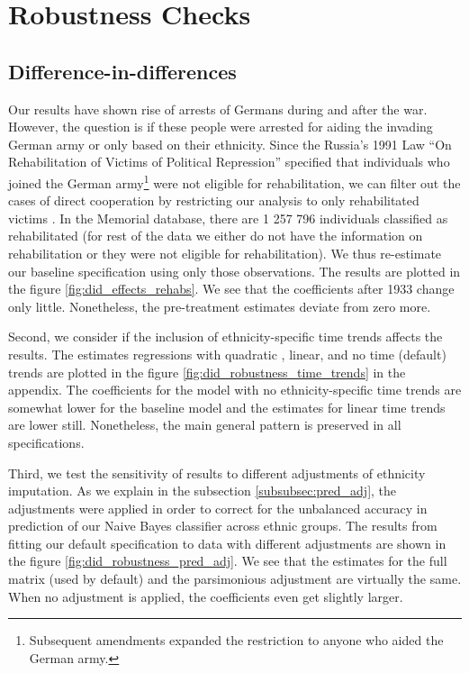 

\section{Robustness Checks} \label{subsec:robust_checks}
\subsection{Difference-in-differences}

Our results have shown rise of arrests of Germans during and after the war. 
However, the question is if these people were arrested for aiding the invading German army or only based on their ethnicity. 
Since the  Russia’s 1991 Law  \enquote{On Rehabilitation of Victims of Political Repression} specified  that individuals who joined the German army\footnote{Subsequent amendments expanded the restriction to anyone who aided the German army. }  were not eligible for rehabilitation, we can filter out the cases of direct 
cooperation by restricting  our analysis to only rehabilitated victims \citep{frierson_russias_2014}. 
In the Memorial database, there  are 1 257 796 individuals  classified as  rehabilitated (for rest of the data we either do not have the information on rehabilitation or they were not eligible for rehabilitation).  We thus re-estimate our baseline specification using only those observations. The results are plotted in the figure \ref{fig:did_effects_rehabs}. We see that the coefficients after 1933 change only little. Nonetheless, the pre-treatment estimates deviate from zero more. 

Second, we consider if the inclusion of ethnicity-specific time trends affects the results.
The estimates regressions with quadratic , linear, and no time (default) trends are  plotted in the figure \ref{fig:did_robustness_time_trends} in the appendix. The coefficients for the model with no ethnicity-specific time trends are somewhat lower for the baseline model and the estimates for linear time trends are lower still. Nonetheless, the main general pattern is preserved in all specifications.

Third, we test the sensitivity of results to different adjustments of ethnicity imputation. 
As we explain in the subsection \ref{subsubsec:pred_adj}, the adjustments were applied in order to correct for the unbalanced accuracy in prediction of our Naive Bayes classifier across ethnic groups. The results from fitting our default specification to data with different adjustments are shown in the figure \ref{fig:did_robustness_pred_adj}.
We see that the estimates for the full matrix (used by default) and the parsimonious adjustment are virtually the same. When no adjustment is applied, the coefficients even get slightly larger. 

